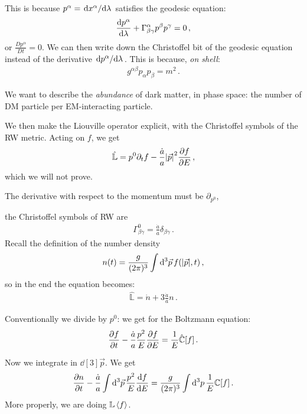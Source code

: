 \documentclass[main.tex]{subfiles}
\begin{document}
This is because \(p^{\alpha } = \dv*{x^{\alpha }}{\lambda }\) satisfies the geodesic equation: 
%
\begin{align}
  \dv{p^{\alpha }}{\lambda } + \Gamma^{\alpha }_{\beta \gamma } p^{\beta } p^{\gamma }=0
\,,
\end{align}
%
or \(\frac{Dp^{\alpha }}{Dt } =0\). We can then write down the Christoffel bit of the geodesic equation instead of the derivative \(\dv*{p^{\alpha }}{\lambda }\). This is because, \emph{on shell}: 
%
\begin{align}
  g^{\alpha \beta } p_{\alpha } p_{\beta } = m^2
\,. 
\end{align}

We want to describe the \emph{abundance} of dark matter, in phase space: the number of DM particle per EM-interacting particle. 

We then make the Liouville operator explicit, with the Christoffel symbols of the RW metric. Acting on \(f\), we get 
%
\begin{align}
  \hat{\mathbb{L}}  = p^{0} \partial_t f - \frac{\dot{a}}{a} \abs{\vec{p}}^2 \pdv{f}{E}
\,,
\end{align}
%
which we will not prove. 

The derivative with respect to the momentum must be \(\partial_{p^{0}}\),


the Christoffel symbols of RW are 
%
\begin{align}
  \Gamma^{0}_{\beta \gamma } = \frac{\dot{a}}{a} \delta_{\beta \gamma }
\,.
\end{align}
%
Recall the definition of the number density 
%
\begin{align}
  n(t) = \frac{g}{(2\pi )^3} \int  \dd[3]{\vec{p}} f(\abs{\vec{p}}, t) 
\,,
\end{align}
%
so in the end the equation becomes: 
%
\begin{align}
  \hat{\mathbb{L}} = \dot{n} + 3 \frac{\dot{a}}{a} n 
\,. 
\end{align}
%

Conventionally we divide by \(p^{0}\): we get for the Boltzmann equation: 
%
\begin{align}
  \pdv{f}{t} - \frac{\dot{a}}{a } \frac{p^2}{E} \pdv{f}{E} = \frac{1}{E} \hat{\mathbb{C}} [f]
\,.
\end{align}

Now we integrate in \(\dd[3]{\vec{p}}\). We get 
%
\begin{align}
  \pdv{n}{t} - \frac{\dot{a}}{a } \int  \dd[3]{\vec{p}} \frac{p^2}{E} \dv{f}{E} = \frac{g }{(2\pi )^3} \int  \dd[3]{p} \frac{1}{E} \mathbb{C} [f]  
\,.
\end{align}
%
More properly, we are doing \(\mathbb{L} \expval{f}\). 
\end{document}

